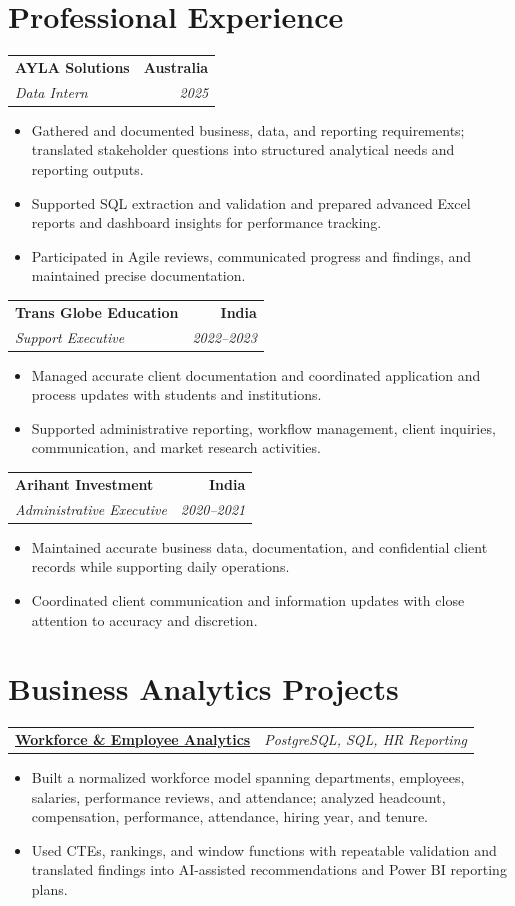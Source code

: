 \documentclass[letterpaper,10pt]{article}
\makeatletter
\newcommand{\role}[4]{%
  \begin{tabularx}{\textwidth}{@{}Xr@{}}
    \textbf{#1} & \textbf{#2} \\
    \textit{#3} & \textit{#4}
  \end{tabularx}\vspace{-1pt}
}
\newcommand{\project}[2]{%
  \begin{tabularx}{\textwidth}{@{}Xr@{}}
    \textbf{#1} & \textit{#2}
  \end{tabularx}\vspace{-1pt}
}
\makeatother
\begin{document}
\section{Professional Experience}
\role{AYLA Solutions}{Australia}{Data Intern}{2025}
\begin{itemize}
  \item Gathered and documented business, data, and reporting requirements; translated stakeholder questions into structured analytical needs and reporting outputs.
  \item Supported SQL extraction and validation and prepared advanced Excel reports and dashboard insights for performance tracking.
  \item Participated in Agile reviews, communicated progress and findings, and maintained precise documentation.
\end{itemize}
\vspace{1pt}

\role{Trans Globe Education}{India}{Support Executive}{2022--2023}
\begin{itemize}
  \item Managed accurate client documentation and coordinated application and process updates with students and institutions.
  \item Supported administrative reporting, workflow management, client inquiries, communication, and market research activities.
\end{itemize}
\vspace{1pt}

\role{Arihant Investment}{India}{Administrative Executive}{2020--2021}
\begin{itemize}
  \item Maintained accurate business data, documentation, and confidential client records while supporting daily operations.
  \item Coordinated client communication and information updates with close attention to accuracy and discretion.
\end{itemize}

\section{Business Analytics Projects}
\project{\href{https://github.com/jainalimehta/HR-Analytics}{Workforce \& Employee Analytics}}{PostgreSQL, SQL, HR Reporting}
\begin{itemize}
  \item Built a normalized workforce model spanning departments, employees, salaries, performance reviews, and attendance; analyzed headcount, compensation, performance, attendance, hiring year, and tenure.
  \item Used CTEs, rankings, and window functions with repeatable validation and translated findings into AI-assisted recommendations and Power BI reporting plans.
\end{itemize}
\vspace{1pt}
\end{document}
